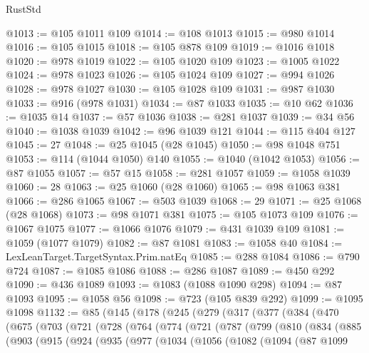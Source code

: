 \begin{lexlean}{RustStd}
\begin{coremodule}
@1013 := @105 @1011 @109
@1014 := @108 @1013
@1015 := @980 @1014
@1016 := @105 @1015
@1018 := @105 @878 @109
@1019 := @1016 @1018
@1020 := @978 @1019
@1022 := @105 @1020 @109
@1023 := @1005 @1022
@1024 := @978 @1023
@1026 := @105 @1024 @109
@1027 := @994 @1026
@1028 := @978 @1027
@1030 := @105 @1028 @109
@1031 := @987 @1030
@1033 := @916 (@978 @1031)
@1034 := @87 @1033
@1035 := @10 @62
@1036 := @1035 @14
@1037 := @57 @1036
@1038 := @281 @1037
@1039 := @34 @56
@1040 := @1038 @1039
@1042 := @96 @1039 @121
@1044 := @115 @404 @127
@1045 := 27
@1048 := @25 @1045 (@28 @1045)
@1050 := @98 @1048 @751
@1053 := @114 (@1044 @1050) @140
@1055 := @1040 (@1042 @1053)
@1056 := @87 @1055
@1057 := @57 @15
@1058 := @281 @1057
@1059 := @1058 @1039
@1060 := 28
@1063 := @25 @1060 (@28 @1060)
@1065 := @98 @1063 @381
@1066 := @286 @1065
@1067 := @503 @1039
@1068 := 29
@1071 := @25 @1068 (@28 @1068)
@1073 := @98 @1071 @381
@1075 := @105 @1073 @109
@1076 := @1067 @1075
@1077 := @1066 @1076
@1079 := @431 @1039 @109
@1081 := @1059 (@1077 @1079)
@1082 := @87 @1081
@1083 := @1058 @40
@1084 := LexLeanTarget.TargetSyntax.Prim.natEq
@1085 := @288 @1084
@1086 := @790 @724
@1087 := @1085 @1086
@1088 := @286 @1087
@1089 := @450 @292
@1090 := @436 @1089
@1093 := @1083 (@1088 @1090 @298)
@1094 := @87 @1093
@1095 := @1058 @56
@1098 := @723 (@105 @839 @292)
@1099 := @1095 @1098
@1132 := @85
    (@145
      (@178
        (@245
          (@279
            (@317
              (@377
                (@384
                  (@470
                    (@675
                      (@703
                        (@721
                          (@728
                            (@764
                              (@774
                                (@721
                                  (@787
                                    (@799
                                      (@810
                                        (@834
                                          (@885
                                            (@903
                                              (@915
                                                (@924
                                                  (@935
                                                    (@977
                                                      (@1034
                                                        (@1056
                                                          (@1082
                                                            (@1094
                                                              (@87
                                                                @1099

\end{coremodule}
\end{lexlean}
